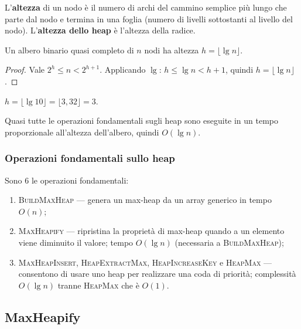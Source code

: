 \begin{definizione}
	L'\textbf{altezza} di un nodo è il numero di archi del cammino
	semplice più lungo che parte dal nodo e termina in una foglia
	(numero di livelli sottostanti al livello del nodo).
	L'\textbf{altezza dello heap} è l'altezza della radice.
\end{definizione}

\begin{teorema}
	Un albero binario quasi completo di $n$ nodi ha altezza
	$h = \lfloor \lg n \rfloor$.
\end{teorema}

\begin{proof}
	Vale $2^h \le n < 2^{h+1}$. Applicando $\lg$: $h \le \lg n < h+1$,
	quindi $h = \lfloor \lg n \rfloor$.
\end{proof}

\begin{esempio}[Altezza con $n=10$]
	$h = \lfloor \lg 10 \rfloor = \lfloor 3{,}32 \rfloor = 3$.
\end{esempio}

\begin{nota}
	Quasi tutte le operazioni fondamentali sugli heap sono eseguite in
	un tempo proporzionale all'altezza dell'albero, quindi $O(\lg n)$.
\end{nota}

\subsubsection{Operazioni fondamentali sullo heap}

Sono 6 le operazioni fondamentali:
\begin{enumerate}
	\item \textsc{BuildMaxHeap} — genera un max-heap da un array
	generico in tempo $O(n)$;
	\item \textsc{MaxHeapify} — ripristina la proprietà di max-heap
	quando a un elemento viene diminuito il valore; tempo
	$O(\lg n)$ (necessaria a \textsc{BuildMaxHeap});
	\item \textsc{MaxHeapInsert}, \textsc{HeapExtractMax},
	\textsc{HeapIncreaseKey} e \textsc{HeapMax} — consentono di
	usare uno heap per realizzare una coda di priorità; complessità
	$O(\lg n)$ tranne \textsc{HeapMax} che è $O(1)$.
\end{enumerate}

\subsection{MaxHeapify}

